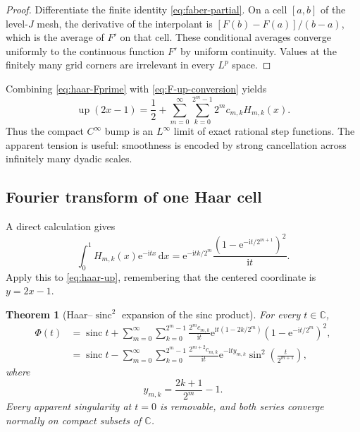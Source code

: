 \documentclass[11pt,oneside]{article}
\newtheorem{theorem}{Theorem}[section]
\theoremstyle{definition}
\theoremstyle{remark}
\newcommand{\C}{\mathbb C}
\newcommand{\Up}{\operatorname{up}}
\newcommand{\sinc}{\operatorname{sinc}}
\newcommand{\dd}{\,\mathrm d}
\newcommand{\ii}{\mathrm i}
\newcommand{\e}{\mathrm e}
\newcommand{\1}{\mathbf 1}
\begin{document}
\begin{proof}
Differentiate the finite identity \eqref{eq:faber-partial}.  On a cell
$[a,b]$ of the level-$J$ mesh, the derivative of the interpolant is
$[F(b)-F(a)]/(b-a)$, which is the average of $F'$ on that cell.  These
conditional averages converge uniformly to the continuous function $F'$ by
uniform continuity.  Values at the finitely many grid corners are irrelevant
in every $L^p$ space.
\end{proof}

Combining \eqref{eq:haar-Fprime} with \eqref{eq:F-up-conversion} yields
\begin{equation}
 \boxed{\displaystyle
 \Up(2x-1)=\frac12+
 \sum_{m=0}^\infty\sum_{k=0}^{2^m-1}
 2^m c_{m,k}H_{m,k}(x).}                                 \label{eq:haar-up}
\end{equation}
Thus the compact $C^\infty$ bump is an $L^\infty$ limit of exact rational
step functions.  The apparent tension is useful: smoothness is encoded by
strong cancellation across infinitely many dyadic scales.

\subsection{Fourier transform of one Haar cell}

A direct calculation gives
\begin{equation}
 \int_0^1H_{m,k}(x)\e^{-\ii tx}\dd x
 =\e^{-\ii tk/2^m}
   \frac{(1-\e^{-\ii t/2^{m+1}})^2}{\ii t}.              \label{eq:haar-transform}
\end{equation}
Apply this to \eqref{eq:haar-up}, remembering that the centered coordinate is
$y=2x-1$.

\begin{theorem}[Haar--$\sinc^2$ expansion of the sinc product]
\label{thm:haar-Phi}
For every $t\in\C$,
\begin{align}
 \Phi(t)
 &=\sinc t+
 \sum_{m=0}^\infty\sum_{k=0}^{2^m-1}
 \frac{2^m c_{m,k}}{\ii t}
 \e^{\ii t(1-2k/2^m)}
 \left(1-\e^{-\ii t/2^m}\right)^2,                     \label{eq:haar-Phi-complex}\\
 &=\sinc t-
 \sum_{m=0}^\infty\sum_{k=0}^{2^m-1}
 \frac{2^{m+2}c_{m,k}}{\ii t}
 \e^{-\ii t y_{m,k}}
 \sin^2\!\left(\frac{t}{2^{m+1}}\right),              \label{eq:haar-Phi-centered}
\end{align}
where
\begin{equation}
 y_{m,k}=\frac{2k+1}{2^m}-1.                             \label{eq:haar-center-y}
\end{equation}
Every apparent singularity at $t=0$ is removable, and both series converge
normally on compact subsets of $\C$.
\end{theorem}
\end{document}
